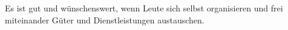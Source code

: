 Es ist gut und wünschenswert, wenn Leute sich selbst organisieren und frei miteinander Güter und Dienstleistungen austauschen.